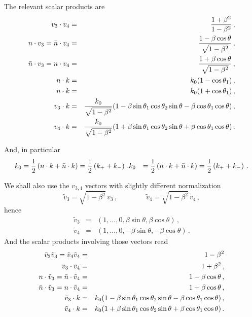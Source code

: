 \documentclass[a4paper,11pt]{report}
\numberwithin{equation}{section}
\begin{document}
The relevant scalar products are
%
\begin{eqnarray}
  v_3 \cdot v_4  & = & \displaystyle \frac{1+\beta^2}{1-\beta^2}\,, \\
  n\cdot v_3 = \bar{n} \cdot v_4 & = & 
  \frac{1-\beta \cos\theta}{\sqrt{1-\beta^2}}\,, \\
  \bar{n}\cdot v_3 = n \cdot v_4 & = & 
  \frac{1+\beta \cos\theta}{\sqrt{1-\beta^2}}\,, \\
  n \cdot k & = & k_0 (1-\cos\theta_1)\,, \\
  \bar{n} \cdot k & = & k_0 (1+\cos\theta_1)\,, \\
  v_3 \cdot k & = & \frac{k_0}{\sqrt{1-\beta^2}}
  (1-\beta\sin\theta_1\cos\theta_2\sin\theta -
  \beta\cos\theta_1\cos\theta)\,, \\
  v_4 \cdot k & = & \frac{k_0}{\sqrt{1-\beta^2}}
  (1+\beta\sin\theta_1\cos\theta_2\sin\theta +
  \beta\cos\theta_1\cos\theta)\,.
\end{eqnarray}

And, in particular
%
\begin{align}
 k_0 & = \frac12\left(n\cdot k + \bar{n} \cdot k\right) 
       = \frac12\left(k_+ + k_-\right)\,.
 k_0 & = \frac12\left(n\cdot k + \bar{n} \cdot k\right) 
       = \frac12\left(k_+ + k_-\right)\,.
\end{align}

We shall also use the $v_{3,4}$ vectors with slightly different normalization
%
\begin{equation}
  \tilde v_3 = \sqrt{1-\beta^2}\, v_3\,,
  \qquad \qquad
  \tilde v_4 = \sqrt{1-\beta^2}\, v_4\,,
  \label{eq:v3v4-tilde-def}
\end{equation}
%
hence
%
\begin{eqnarray}
  \tilde v_3 & = & (1,\ldots,0,\beta\sin\theta,\beta\cos\theta)\,, \\
  \tilde v_4 & = & (1,\ldots,0,-\beta\sin\theta,-\beta\cos\theta)\,.
\end{eqnarray}
%
And the scalar products involving those vectors read
%
\begin{eqnarray}
  \tilde v_3 \tilde v_3  =  \tilde v_4 \tilde v_4 & = & 1-\beta^2
  \\
  \tilde v_3 \cdot \tilde v_4  & = & 1+\beta^2\,, \\
  n\cdot \tilde v_3 = \bar{n} \cdot \tilde v_4 & = & 1-\beta \cos\theta\,, \\
  \bar{n}\cdot \tilde v_3 = n \cdot \tilde v_4 & = & 1+\beta \cos\theta\,, \\
  \tilde v_3 \cdot k & = & k_0 (1-\beta\sin\theta_1\cos\theta_2\sin\theta -
  \beta\cos\theta_1\cos\theta)\,, \\
  \tilde v_4 \cdot k & = & k_0 (1+\beta\sin\theta_1\cos\theta_2\sin\theta +
  \beta\cos\theta_1\cos\theta)\,.
\end{eqnarray}
\end{document}
